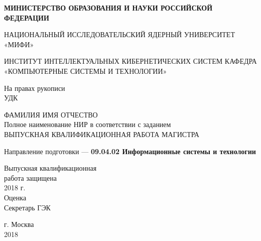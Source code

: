 \documentclass[a4paper,12pt]{article}
\begin{document}

\renewcommand{\refname}{\centerline{СПИСОК ИСПОЛЬЗОВАННОЙ ЛИТЕРАТУРЫ}} 
\renewcommand{\contentsname}{\centerline{СОДЕРЖАНИЕ}} 

%
%
\thispagestyle{empty}

\onehalfspacing


\begin{center}
\onehalfspacing

\textbf{МИНИСТЕРСТВО ОБРАЗОВАНИЯ И НАУКИ РОССИЙСКОЙ ФЕДЕРАЦИИ}

НАЦИОНАЛЬНЫЙ ИССЛЕДОВАТЕЛЬСКИЙ ЯДЕРНЫЙ УНИВЕРСИТЕТ «МИФИ»

ИНСТИТУТ ИНТЕЛЛЕКТУАЛЬНЫХ КИБЕРНЕТИЧЕСКИХ СИСТЕМ
КАФЕДРА «КОМПЬЮТЕРНЫЕ СИСТЕМЫ И ТЕХНОЛОГИИ»\end{center}
\vspace{1cm}
\begin{flushright}
На правах рукописи\\
УДК 
\end{flushright}


\vfill

\begin{center}
\large 
ФАМИЛИЯ ИМЯ ОТЧЕСТВО\\

Полное наименование НИР в соответствии с заданием\\

ВЫПУСКНАЯ КВАЛИФИКАЦИОННАЯ РАБОТА МАГИСТРА
\end{center}

\begin{center}
Направление подготовки ---  \textbf{09.04.02 Информационные системы и технологии}\\
\end{center}

\vspace{1cm}

\begin{flushright}
Выпускная квалификационная\\
работа защищена\\
2018 г.\\
Оценка \\
Секретарь ГЭК
\end{flushright}
\begin{center}
г. Москва\\
2018
\end{center}
\end{document}
